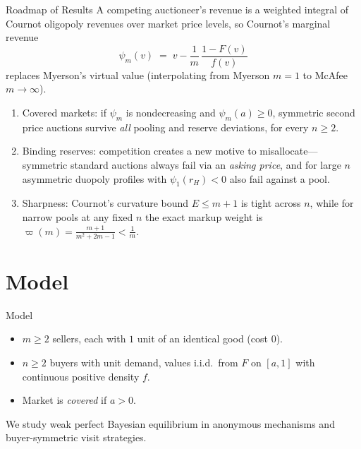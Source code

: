 \documentclass[11pt,aspectratio=169,handout]{beamer}
\def\meditem{\smallskip\item}
\begin{document}
\begin{frame}{Roadmap of Results}
A competing auctioneer's revenue is a weighted integral of \alert{Cournot oligopoly revenues} over market price levels, so Cournot's marginal revenue
\[
\psi_m(v) \;=\; v - \frac{1}{m}\,\frac{1-F(v)}{f(v)}
\]
replaces Myerson's virtual value (interpolating from Myerson $m=1$ to McAfee $m\to\infty$).

\medskip{}
\begin{enumerate}
\item \alert{Covered markets}: if $\psi_m$ is nondecreasing and $\psi_m(a)\ge 0$, symmetric second price auctions survive \emph{all} pooling and reserve deviations, for every $n\ge 2$.
\meditem \alert{Binding reserves}: competition creates a new motive to misallocate---symmetric standard auctions always fail via an \emph{asking price}, and for large $n$ asymmetric duopoly profiles with $\psi_1(r_H)<0$ also fail against a pool.
\meditem \alert{Sharpness}: Cournot's curvature bound $E\le m+1$ is tight across $n$, while for narrow pools at any fixed $n$ the exact markup weight is $\varpi(m)=\frac{m+1}{m^2+2m-1}<\frac1m$.
\end{enumerate}
\end{frame}

\section{Model}

\begin{frame}{Model}
\begin{itemize}
\item $m\ge 2$ sellers, each with $1$ unit of an identical good (cost $0$).
\item $n\ge 2$ buyers with unit demand, values i.i.d.\ from $F$ on $[a,1]$ with continuous positive density $f$.
\item Market is \emph{covered} if $a>0$.
\end{itemize}

\bigskip
\centering
{}

\raggedright\bigskip
We study weak perfect Bayesian equilibrium in anonymous mechanisms and buyer-symmetric visit strategies.
\end{frame}
\end{document}
